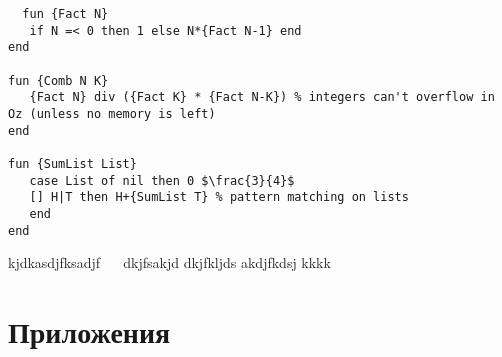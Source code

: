\documentclass[a4paper, 12pt]{book}
\begin{document}
\begin{lstlisting}
  fun {Fact N}
   if N =< 0 then 1 else N*{Fact N-1} end
end
 
fun {Comb N K}
   {Fact N} div ({Fact K} * {Fact N-K}) % integers can't overflow in Oz (unless no memory is left)
end
 
fun {SumList List}
   case List of nil then 0 $\frac{3}{4}$
   [] H|T then H+{SumList T} % pattern matching on lists
   end
end
\end{lstlisting}

kjdkasdjfksadjf ~~ dkjfsakjd dkjfkljds akdjfkdsj kkkk

\part{Приложения}

\end{document}
